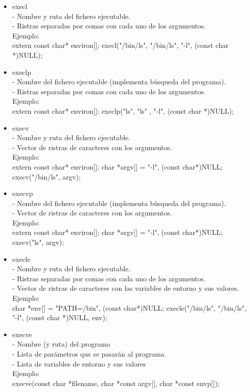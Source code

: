 	\begin{itemize}

		\item execl
\\ - Nombre y ruta del fichero ejecutable. 
\\ - Ristras separadas por comas con cada uno de los argumentos. 
\\ Ejemplo: 
\\ extern const char* environ[]; execl("/bin/ls", "/bin/ls", "-l", (const char *)NULL);

		\item execlp
\\ - Nombre del fichero ejecutable (implementa búsqueda del programa). 
\\ - Ristras separadas por comas con cada uno de los argumentos. 
\\ Ejemplo: 
\\ extern const char* environ[]; execlp("ls", "ls" , "-l", (const char *)NULL);

		\item execv
\\ - Nombre y ruta del fichero ejecutable. 
\\ - Vector de ristras de caracteres con los argumentos. 
\\ Ejemplo:
\\ extern const char* environ[]; char *argv[] = {"-l", (const char*)NULL}; execv("/bin/ls", argv);

		\item execvp
\\ - Nombre del fichero ejecutable (implementa búsqueda del programa). 
\\ - Vector de ristras de caracteres con los argumentos. 
\\ Ejemplo: 
\\ extern const char* environ[]; char *argv[] = {"-l", (const char*)NULL}; execv("ls", argv);

		\item execle	
\\ - Nombre y ruta del fichero ejecutable. 
\\ - Ristras separadas por comas con cada uno de los argumentos. 
\\ - Vector de ristras de caracteres con las variables de entorno y sus valores. 
\\ Ejemplo:
\\ char *env[] = {"PATH=/bin", (const char*)NULL}; execle("/bin/ls", "/bin/ls", "-l", (const char *)NULL, env);

		\item execve
\\ - Nombre (y ruta) del programa 
\\ - Lista de parámetros que se pasarán al programa 
\\ - Lista de variables de entorno y sus valores
\\ Ejemplo: 
\\ execve(const char *filename, char *const argv[], char *const envp[]);

	\end{itemize}
